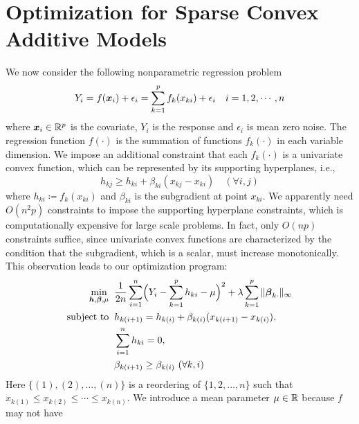 \section{Optimization for Sparse Convex Additive Models}

We now consider the following nonparametric regression problem
\begin{equation}\nonumber
          Y_{i} = f(\boldsymbol{x}_{i}) + \epsilon_{i} = 
                  \sum_{k=1}^{p}f_{k}(x_{ki}) + \epsilon_{i} \quad i=1,2,\cdots,n
\end{equation}
where $\boldsymbol{x}_{i}\in\mathbb{R}^{p}$ is the covariate, $Y_{i}$ is the
response and $\epsilon_{i}$ is mean zero noise. The regression function $f(\cdot)$ is the summation of 
functions $f_{k}(\cdot)$ in each variable dimension.  
We impose an additional constraint that each $f_{k}(\cdot)$ is 
a univariate convex function, which can be represented by its supporting hyperplanes, i.e.,
\begin{equation}\label{hyper}
      h_{kj} \geq h_{ki} + \beta_{ki}(x_{kj}-x_{ki}) \quad (\forall i,j)
\end{equation}
where $h_{ki}\coloneqq f_{k}(x_{ki})$ and $\beta_{ki}$ is the
subgradient at point $x_{ki}$. We apparently need $O(n^2 p)$ constraints to
impose the supporting hyperplane constraints, which is computationally
expensive for large scale problems.  In fact, only $O(np)$
constraints suffice, since univariate convex functions are
characterized by the condition that the subgradient, which is a scalar, must
increase monotonically. This observation leads to our optimization
program:
\begin{equation}
\begin{split}
       \min_{\bds{h},\bds{\beta},\mu} & \;\; \frac{1}{2n}\sum_{i=1}^{n}
                     \Bigl( Y_{i}-\sum_{k=1}^{p}h_{ki} - \mu \Bigr)^{2} 
                         + \lambda\sum_{k=1}^{p}\|\bds{\beta}_{k\cdot}\|_{\infty} \\
       \textrm{subject to} &\;\; h_{k(i+1)} = h_{k(i)} + \beta_{k(i)}(x_{k(i+1)}-x_{k(i)}), \\
                     & \;\; \sum_{i=1}^{n}h_{ki}=0,\\
                     & \;\; \beta_{k(i+1)} \geq \beta_{k(i)} \ (\forall k, i)
\end{split}
\label{np}
\end{equation}
Here $\{(1),(2),\ldots,(n)\}$ is a reordering of $\{1,2,\ldots,n\}$ such that $x_{k(1)}\leq{}x_{k(2)}\leq\cdots\leq{}x_{k(n)}$.  We introduce a mean parameter $\mu \in \mathbb{R}$ because $f$ may not have

